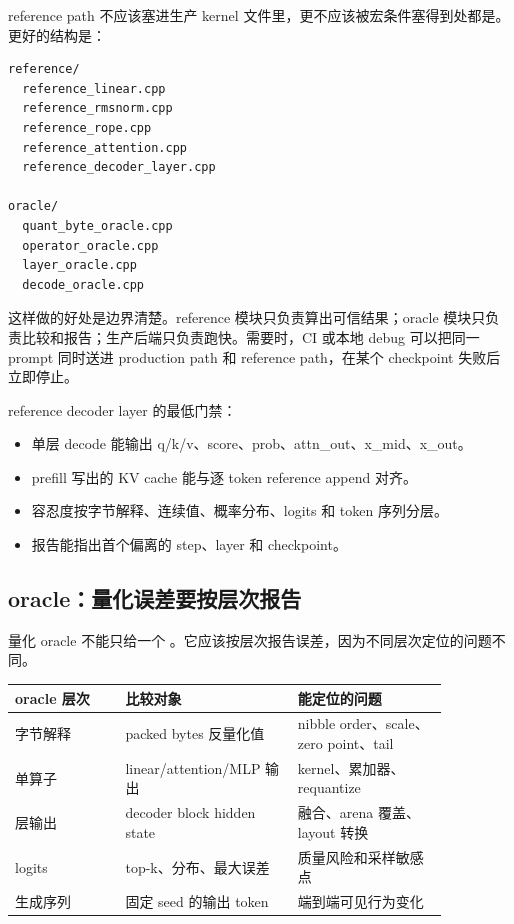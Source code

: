 reference path 不应该塞进生产 kernel 文件里，更不应该被宏条件塞得到处都是。更好的结构是：

\begin{lstlisting}[numbers=none,caption={reference/oracle 的项目结构草图}]
reference/
  reference_linear.cpp
  reference_rmsnorm.cpp
  reference_rope.cpp
  reference_attention.cpp
  reference_decoder_layer.cpp

oracle/
  quant_byte_oracle.cpp
  operator_oracle.cpp
  layer_oracle.cpp
  decode_oracle.cpp
\end{lstlisting}

这样做的好处是边界清楚。reference 模块只负责算出可信结果；oracle 模块只负责比较和报告；生产后端只负责跑快。需要时，CI 或本地 debug 可以把同一 prompt 同时送进 production path 和 reference path，在某个 checkpoint 失败后立即停止。

\begin{rubricbox}
reference decoder layer 的最低门禁：
\begin{itemize}
  \item 单层 decode 能输出 q/k/v、score、prob、attn\_out、x\_mid、x\_out。
  \item prefill 写出的 KV cache 能与逐 token reference append 对齐。
  \item 容忍度按字节解释、连续值、概率分布、logits 和 token 序列分层。
  \item 报告能指出首个偏离的 step、layer 和 checkpoint。
\end{itemize}
\end{rubricbox}

\subsection{oracle：量化误差要按层次报告}

量化 oracle 不能只给一个 。它应该按层次报告误差，因为不同层次定位的问题不同。

\begin{center}
\begin{tabular}{p{0.22\linewidth}p{0.34\linewidth}p{0.30\linewidth}}
\toprule
oracle 层次 & 比较对象 & 能定位的问题 \\
\midrule
字节解释 & packed bytes 反量化值 & nibble order、scale、zero point、tail \\
单算子 & linear/attention/MLP 输出 & kernel、累加器、requantize \\
层输出 & decoder block hidden state & 融合、arena 覆盖、layout 转换 \\
logits & top-k、分布、最大误差 & 质量风险和采样敏感点 \\
生成序列 & 固定 seed 的输出 token & 端到端可见行为变化 \\
\bottomrule
\end{tabular}
\end{center}

